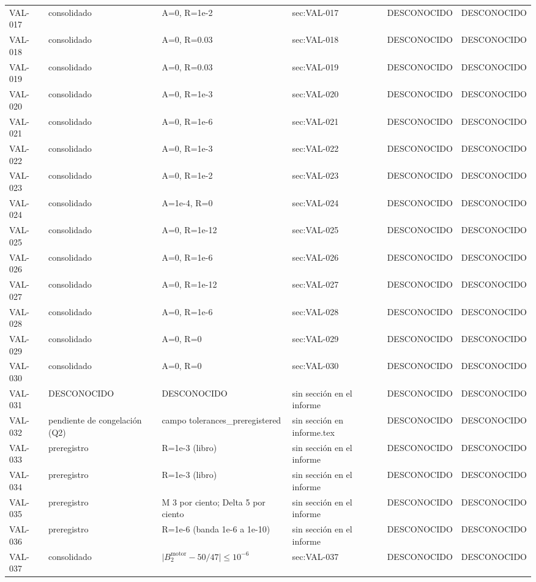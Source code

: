 \begin{longtable}{@{}ll>{\raggedright\arraybackslash}p{4.6cm}lll@{}}
VAL-017 & consolidado & A=0, R=1e-2 & sec:VAL-017 & DESCONOCIDO & DESCONOCIDO \\
VAL-018 & consolidado & A=0, R=0.03 & sec:VAL-018 & DESCONOCIDO & DESCONOCIDO \\
VAL-019 & consolidado & A=0, R=0.03 & sec:VAL-019 & DESCONOCIDO & DESCONOCIDO \\
VAL-020 & consolidado & A=0, R=1e-3 & sec:VAL-020 & DESCONOCIDO & DESCONOCIDO \\
VAL-021 & consolidado & A=0, R=1e-6 & sec:VAL-021 & DESCONOCIDO & DESCONOCIDO \\
VAL-022 & consolidado & A=0, R=1e-3 & sec:VAL-022 & DESCONOCIDO & DESCONOCIDO \\
VAL-023 & consolidado & A=0, R=1e-2 & sec:VAL-023 & DESCONOCIDO & DESCONOCIDO \\
VAL-024 & consolidado & A=1e-4, R=0 & sec:VAL-024 & DESCONOCIDO & DESCONOCIDO \\
VAL-025 & consolidado & A=0, R=1e-12 & sec:VAL-025 & DESCONOCIDO & DESCONOCIDO \\
VAL-026 & consolidado & A=0, R=1e-6 & sec:VAL-026 & DESCONOCIDO & DESCONOCIDO \\
VAL-027 & consolidado & A=0, R=1e-12 & sec:VAL-027 & DESCONOCIDO & DESCONOCIDO \\
VAL-028 & consolidado & A=0, R=1e-6 & sec:VAL-028 & DESCONOCIDO & DESCONOCIDO \\
VAL-029 & consolidado & A=0, R=0 & sec:VAL-029 & DESCONOCIDO & DESCONOCIDO \\
VAL-030 & consolidado & A=0, R=0 & sec:VAL-030 & DESCONOCIDO & DESCONOCIDO \\
VAL-031 & DESCONOCIDO & DESCONOCIDO & sin sección en el informe & DESCONOCIDO & DESCONOCIDO \\
VAL-032 & pendiente de congelación (Q2) & campo tolerances\_preregistered & sin sección en informe.tex & DESCONOCIDO & DESCONOCIDO \\
VAL-033 & preregistro & R=1e-3 (libro) & sin sección en el informe & DESCONOCIDO & DESCONOCIDO \\
VAL-034 & preregistro & R=1e-3 (libro) & sin sección en el informe & DESCONOCIDO & DESCONOCIDO \\
VAL-035 & preregistro & M 3 por ciento; Delta 5 por ciento & sin sección en el informe & DESCONOCIDO & DESCONOCIDO \\
VAL-036 & preregistro & R=1e-6 (banda 1e-6 a 1e-10) & sin sección en el informe & DESCONOCIDO & DESCONOCIDO \\
VAL-037 & consolidado & \(\lvert B_2^{\mathrm{motor}}-50/47\rvert\le 10^{-6}\) & sec:VAL-037 & DESCONOCIDO & DESCONOCIDO \\

\end{longtable}
